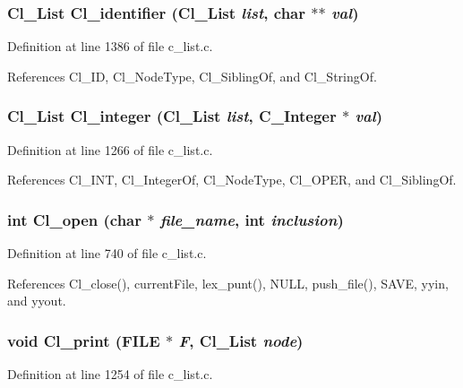\subsubsection{\setlength{\rightskip}{0pt plus 5cm}\bf{Cl\_\-List} Cl\_\-identifier (\bf{Cl\_\-List} {\em list}, char $\ast$$\ast$ {\em val})}\label{c__list_8h_dda84882bcbab381e8e93bbd4a82e611}




Definition at line 1386 of file c\_\-list.c.

References Cl\_\-ID, Cl\_\-Node\-Type, Cl\_\-Sibling\-Of, and Cl\_\-String\-Of.
\subsubsection{\setlength{\rightskip}{0pt plus 5cm}\bf{Cl\_\-List} Cl\_\-integer (\bf{Cl\_\-List} {\em list}, \bf{C\_\-Integer} $\ast$ {\em val})}\label{c__list_8h_7c11ba87e404bd4c849029d4fab90c8a}




Definition at line 1266 of file c\_\-list.c.

References Cl\_\-INT, Cl\_\-Integer\-Of, Cl\_\-Node\-Type, Cl\_\-OPER, and Cl\_\-Sibling\-Of.
\subsubsection{\setlength{\rightskip}{0pt plus 5cm}int Cl\_\-open (char $\ast$ {\em file\_\-name}, int {\em inclusion})}\label{c__list_8h_c5c20eb36123e901c07727a1b6a1e6dd}




Definition at line 740 of file c\_\-list.c.

References Cl\_\-close(), current\-File, lex\_\-punt(), NULL, push\_\-file(), SAVE, yyin, and yyout.
\subsubsection{\setlength{\rightskip}{0pt plus 5cm}void Cl\_\-print (FILE $\ast$ {\em F}, \bf{Cl\_\-List} {\em node})}\label{c__list_8h_1a08bd2e228bd74aa950036ffefbbc3d}




Definition at line 1254 of file c\_\-list.c.

